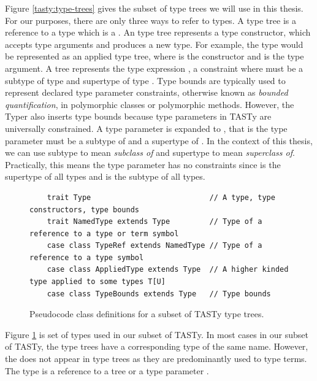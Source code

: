 Figure \ref{tasty:type-trees} gives the subset of type trees we will use in this thesis.
For our purposes, there are only three ways to refer to types.
A  type tree is a reference to a type which is a .
An  type tree represents a type constructor, which accepts type arguments and produces a new type.
For example, the type  would be represented as an applied type tree, where  is the constructor and  is the type argument.
A  tree represents the type expression , a constraint where  must be a subtype of type  and supertype of type .
Type bounds are typically used to represent declared type parameter constraints, otherwise known as \textit{bounded quantification}\cite{systemF:subtyping}, in polymorphic classes or polymorphic methods.
However, the Typer also inserts type bounds because type parameters in TASTy are universally constrained.
A type parameter  is expanded to , that is the type parameter  must be a subtype of  and a supertype of .
In the context of this thesis, we can use subtype to mean \textit{subclass of} and supertype to mean \textit{superclass of}.
Practically, this means the type parameter  has no constraints since  is the supertype of all types and  is the subtype of all types.

\begin{figure}[!htb]
	\begin{verbatim}
	trait Type                           // A type, type constructors, type bounds
	trait NamedType extends Type         // Type of a reference to a type or term symbol
	case class TypeRef extends NamedType // Type of a reference to a type symbol
	case class AppliedType extends Type  // A higher kinded type applied to some types T[U]
	case class TypeBounds extends Type   // Type bounds
	\end{verbatim} 
	\caption{Pseudocode class definitions for a subset of TASTy type trees.}
	\label{tasty:types}
\end{figure}

Figure \ref{tasty:types} is set of types used in our subset of TASTy.
In most cases in our subset of TASTy, the type trees have a corresponding type of the same name.
However, the  does not appear in type trees as they are predominantly used to type terms.
The  type is a reference to a  tree or a type parameter .

